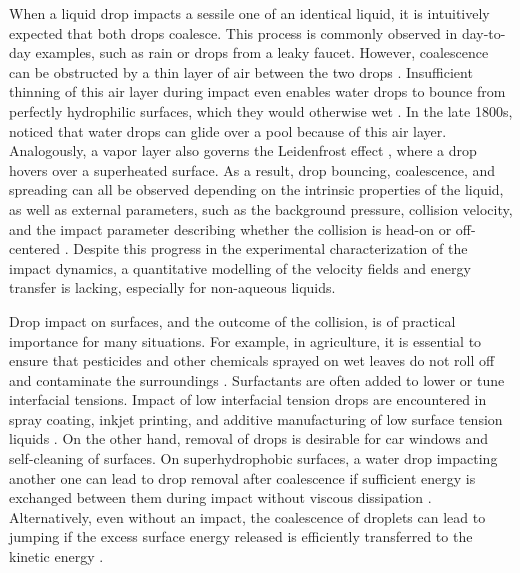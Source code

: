 When a liquid drop impacts a sessile one of an identical liquid, it is intuitively expected that both drops coalesce. This process is commonly observed in day-to-day examples, such as rain or drops from a leaky faucet. However, coalescence can be obstructed by a thin layer of air between the two drops \citep{Wadhwa2013, kavehpour-2015-arfm, finotello2018dynamics}. Insufficient thinning of this air layer during impact even enables water drops to bounce from perfectly hydrophilic surfaces, which they would otherwise wet \citep{kolinski2014drops, de2015wettability,latka2018drop}. In the late 1800s, \citet{reynolds1881floating} noticed that water drops can glide over a pool because of this air layer. Analogously, a vapor layer also governs the Leidenfrost effect \citep{Boerhaave1732, leidenfrost1756, tran2012drop, quere2013leidenfrost, adera2013non, pham2017spontaneous}, where a drop hovers over a superheated surface. As a result, drop bouncing, coalescence, and spreading can all be observed depending on the intrinsic properties of the liquid, as well as external parameters, such as the background pressure, collision velocity, and the impact parameter describing whether the collision is head-on or off-centered \citep{jiang1992, qian1997, tang2012bouncing, sykes2020surface}. Despite this progress in the experimental characterization of the impact dynamics, a quantitative modelling of the velocity fields and energy transfer is lacking, especially for non-aqueous liquids. 

Drop impact on surfaces, and the outcome of the collision, is of practical importance for many situations. For example, in agriculture, it is essential to ensure that pesticides and other chemicals sprayed on wet leaves do not roll off and contaminate the surroundings \cite{bergeron2000}. Surfactants are often added to lower or tune interfacial tensions. Impact of low interfacial tension drops are encountered in spray coating, inkjet printing, and additive manufacturing of low surface tension liquids \citep{sturgess2017, skylar-scott2019}. On the other hand, removal of drops is desirable for car windows \citep{lv2014bio} and self-cleaning of surfaces. On superhydrophobic surfaces, a water drop impacting another one can lead to drop removal after coalescence if sufficient energy is exchanged between them during impact without viscous dissipation \cite{farhangi2012, damak2018}. Alternatively, even without an impact, the coalescence of droplets can lead to jumping if the excess surface energy released is efficiently transferred to the kinetic energy  \citep{boreyko2009, liu2014, mouterde2017merging, lecointre2019ballistics}.

